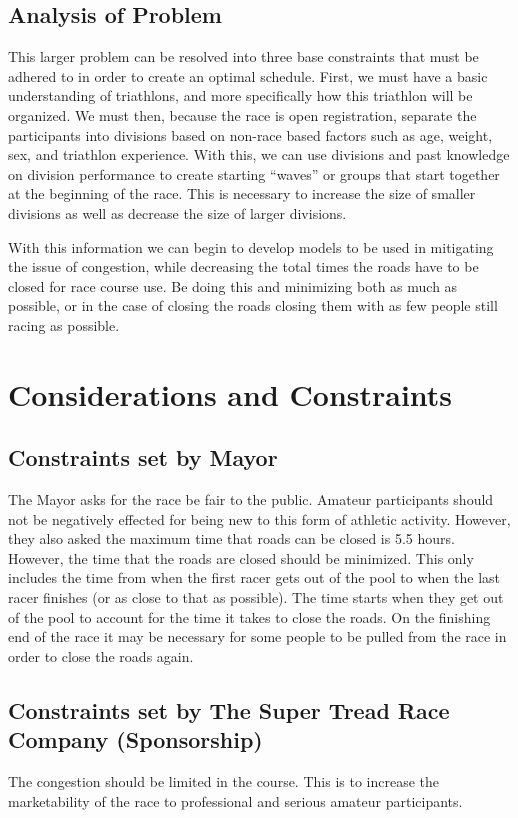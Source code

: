 \documentclass[12pt]{article}
\begin{document}
\subsection{Analysis of Problem}

This larger problem can be resolved into three base constraints that must be adhered to in order to create an optimal schedule. First, we must have a basic understanding of triathlons, and more specifically how this triathlon will be organized. We must then, because the race is open registration, separate the participants into divisions based on non-race based factors such as age, weight, sex, and triathlon experience. With this, we can use divisions and past knowledge on division performance to create starting “waves” or groups that start together at the beginning of the race. This is necessary to increase the size of smaller divisions as well as decrease the size of larger divisions.\par 

With this information we can begin to develop models to be used in mitigating the issue of congestion, while decreasing the total times the roads have to be closed for race course use. Be doing this and minimizing both as much as possible, or in the case of closing the roads closing them with as few people still racing as possible.

\section{Considerations and Constraints}
\subsection{Constraints set by Mayor}
The Mayor asks for the race be fair to the public. Amateur participants should not be negatively effected for being new to this form of athletic activity. However, they also asked the maximum time that roads can be closed is 5.5 hours. However, the time that the roads are closed should be minimized. This only includes the time from when the first racer gets out of the pool to when the last racer finishes (or as close to that as possible). The time starts when they get out of the pool to account for the time it takes to close the roads. On the finishing end of the race it may be necessary for some people to be pulled from the race in order to close the roads again.

\subsection{Constraints set by The Super Tread Race Company (Sponsorship)}
The congestion should be limited in the course. This is to increase the marketability of the race to professional and serious amateur participants.
\end{document}
